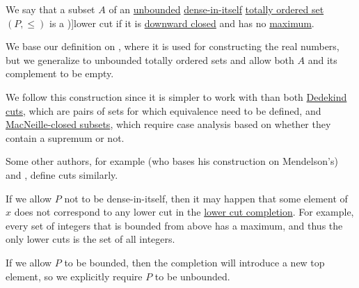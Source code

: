 \begin{definition}\label{def:lower_cut}
  We say that a subset \( A \) of an \hyperref[def:extremal_points/bounds]{unbounded} \hyperref[def:dense_total_order]{dense-in-itself} \hyperref[def:totally_ordered_set]{totally ordered set} \( (P, \leq) \) is a \term[en=lower cut (\cite[325]{Mendelson2008NumberSystems})]{lower cut} if it is \hyperref[def:closed_ordered_subset]{downward closed} and has no \hyperref[def:extremal_points/maximum_and_minimum]{maximum}.
\end{definition}
\begin{comments}
  \item We base our definition on \cite[325]{Mendelson2008NumberSystems}, where it is used for constructing the real numbers, but we generalize to unbounded totally ordered sets and allow both \( A \) and its complement to be empty.

  We follow this construction since it is simpler to work with than both \hyperref[def:dedekind_cut]{Dedekind cuts}, which are pairs of sets for which equivalence need to be defined, and \hyperref[def:macnielle_closure]{MacNeille-closed subsets}, which require case analysis based on whether they contain a supremum or not.

  Some other authors, for example \textcite[113]{Enderton1977SetTheory} (who bases his construction on Mendelson's) and \textcite[17]{Rudin1976AnalysisPrinciples}, define cuts similarly.

  \item If we allow \( P \) not to be dense-in-itself, then it may happen that some element of \( x \) does not correspond to any lower cut in the \hyperref[def:lower_cut_completion]{lower cut completion}. For example, every set of integers that is bounded from above has a maximum, and thus the only lower cuts is the set of all integers.

  \item If we allow \( P \) to be bounded, then the completion will introduce a new top element, so we explicitly require \( P \) to be unbounded.
\end{comments}

